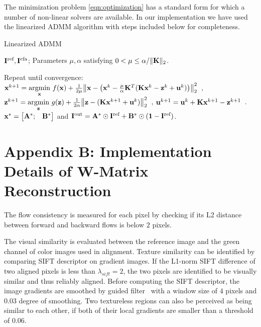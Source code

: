 	The minimization problem \eqref{eqn:optimization} has a
        standard form for which a number of non-linear solvers are
        available. In our implementation we have used the linearized ADMM algorithm with steps included below for completeness.
	\begin{algorithm}[H]
		\begin{algorithmic}[1]
			\caption{Linearized ADMM} \label{tab:ADMM}
			\Input $\mathbf{I^{\textrm{ref}}}, \mathbf{I^{\text{cfa}}}$; Parameters $\mu, \alpha$ satisfying $0<\mu \le \alpha/\|\mathbf{K}\|_{2}$.
			\item[Repeat until convergence:]
			\State $\mathbf{x}^{k+1} = \underset{\mathbf{x}}{\text{argmin}}~ f(\mathbf{x}) + \frac{1}{2\mu}\big\|\mathbf{x} - \big( \mathbf{x}^{k}-\frac{\mu}{\alpha}\mathbf{K}^{T}(\mathbf{K}\mathbf{x}^{k}-\mathbf{z}^{k}+\mathbf{u}^{k} ) \big) \big\|_2^2$~,
			\State $\mathbf{z}^{k+1} = \underset{\mathbf{z}}{\text{argmin}}~ g(\mathbf{z})+ \frac{1}{2\alpha}\big\| \mathbf{z} - (\mathbf{K} \mathbf{x}^{k+1}+\mathbf{u}^{k}) \big\|_2^2 $~,
			\State $\mathbf{u}^{k+1} = \mathbf{u}^{k} + \mathbf{K}\mathbf{x}^{k+1} - \mathbf{z}^{k+1}$~.
			\Output $\mathbf{x}^{*} = \begin{bmatrix}
			\mathbf{A}^{*}; & \mathbf{B}^{*}
			\end{bmatrix}$ and $\mathbf{I^{\textrm{out}}} = \mathbf{A}^{*} \odot \mathbf{I^{\textrm{ref}}}+ \mathbf{B}^{*} \odot (\mathbf{1}-\mathbf{I^{\textrm{ref}}})$.
		\end{algorithmic}
	\end{algorithm}
	
\section*{Appendix B: Implementation Details of W-Matrix Reconstruction }

The flow consistency is measured for
each pixel by checking if its L2 distance between forward and backward
flows is below $2$ pixels. 

The visual similarity is evaluated	between the reference image and the green channel of color images used in alignment. 
Texture similarity can be identified by comparing SIFT descriptor \cite{Lowe:2004:SIFT} on gradient images.
If the L1-norm SIFT difference of two aligned pixels is less than $\lambda_{sift}=2$, the two pixels are
identified to be visually similar and thus reliably aligned. 
Before computing the SIFT descriptor, the image gradients are smoothed by
guided filter~\cite{He:2013:GIF} with a window size of $4$ pixels and
$0.03$ degree of smoothing. 
Two textureless regions can also be perceived as being similar to each other,  if both of their local gradients are smaller than a threshold of $0.06$.

